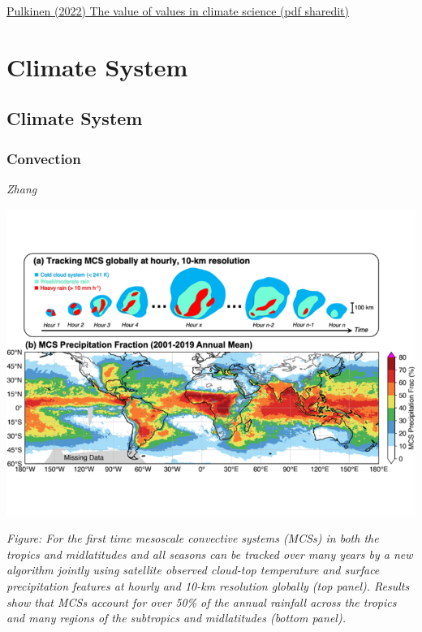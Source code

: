\documentclass[
]{book}
\begin{document}
\href{https://www.nature.com/articles/s41558-021-01238-9.epdf?sharing_token=9sTaZge6-YVe29-rqhAuSdRgN0jAjWel9jnR3ZoTv0MW3oJvK3EImaMOhYg7TVKCUXr-xeCVyJ-lnFq2VH0GssNQt3AoQqZNQ5E7rSfw455t4_ZH4hJb0dBw9N22Lmlthe2YWgCjryCcYhhd_v-P1KPND7gwYWDiLyksdRInlw4\%3D}{Pulkinen (2022) The value of values in climate science (pdf sharedit)}

\hypertarget{part-climate-system}{%
\part{Climate System}\label{part-climate-system}}

\hypertarget{climate-system}{%
\chapter{Climate System}\label{climate-system}}

\hypertarget{convection}{%
\section{Convection}\label{convection}}

\emph{Zhang}

\includegraphics{fig/mesoscale_convection.png}

\emph{Figure: For the first time mesoscale convective systems (MCSs) in both the tropics and midlatitudes and all seasons can be tracked over many years by a new algorithm jointly using satellite observed cloud-top temperature and surface precipitation features at hourly and 10-km resolution globally (top panel). Results show that MCSs account for over 50\% of the annual rainfall across the tropics and many regions of the subtropics and midlatitudes (bottom panel).}
\end{document}
